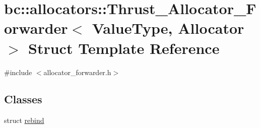 \hypertarget{structbc_1_1allocators_1_1Thrust__Allocator__Forwarder}{}\section{bc\+:\+:allocators\+:\+:Thrust\+\_\+\+Allocator\+\_\+\+Forwarder$<$ Value\+Type, Allocator $>$ Struct Template Reference}
\label{structbc_1_1allocators_1_1Thrust__Allocator__Forwarder}


{\ttfamily \#include $<$allocator\+\_\+forwarder.\+h$>$}

\subsection*{Classes}
\begin{DoxyCompactItemize}
\item 
struct \hyperlink{structbc_1_1allocators_1_1Thrust__Allocator__Forwarder_1_1rebind}{rebind}
\end{DoxyCompactItemize}
